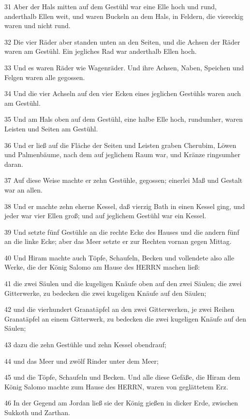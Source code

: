 \par 31 Aber der Hals mitten auf dem Gestühl war eine Elle hoch und rund, anderthalb Ellen weit, und waren Buckeln an dem Hals, in Feldern, die viereckig waren und nicht rund.
\par 32 Die vier Räder aber standen unten an den Seiten, und die Achsen der Räder waren am Gestühl. Ein jegliches Rad war anderthalb Ellen hoch.
\par 33 Und es waren Räder wie Wagenräder. Und ihre Achsen, Naben, Speichen und Felgen waren alle gegossen.
\par 34 Und die vier Achseln auf den vier Ecken eines jeglichen Gestühls waren auch am Gestühl.
\par 35 Und am Hals oben auf dem Gestühl, eine halbe Elle hoch, rundumher, waren Leisten und Seiten am Gestühl.
\par 36 Und er ließ auf die Fläche der Seiten und Leisten graben Cherubim, Löwen und Palmenbäume, nach dem auf jeglichem Raum war, und Kränze ringsumher daran.
\par 37 Auf diese Weise machte er zehn Gestühle, gegossen; einerlei Maß und Gestalt war an allen.
\par 38 Und er machte zehn eherne Kessel, daß vierzig Bath in einen Kessel ging, und jeder war vier Ellen groß; und auf jeglichem Gestühl war ein Kessel.
\par 39 Und setzte fünf Gestühle an die rechte Ecke des Hauses und die andern fünf an die linke Ecke; aber das Meer setzte er zur Rechten vornan gegen Mittag.
\par 40 Und Hiram machte auch Töpfe, Schaufeln, Becken und vollendete also alle Werke, die der König Salomo am Hause des HERRN machen ließ:
\par 41 die zwei Säulen und die kugeligen Knäufe oben auf den zwei Säulen; die zwei Gitterwerke, zu bedecken die zwei kugeligen Knäufe auf den Säulen;
\par 42 und die vierhundert Granatäpfel an den zwei Gitterwerken, je zwei Reihen Granatäpfel an einem Gitterwerk, zu bedecken die zwei kugeligen Knäufe auf den Säulen;
\par 43 dazu die zehn Gestühle und zehn Kessel obendrauf;
\par 44 und das Meer und zwölf Rinder unter dem Meer;
\par 45 und die Töpfe, Schaufeln und Becken. Und alle diese Gefäße, die Hiram dem König Salomo machte zum Hause des HERRN, waren von geglättetem Erz.
\par 46 In der Gegend am Jordan ließ sie der König gießen in dicker Erde, zwischen Sukkoth und Zarthan.
